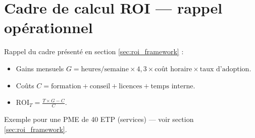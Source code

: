 \section{Cadre de calcul ROI — rappel opérationnel}
Rappel du cadre présenté en section \ref{sec:roi_framework} :
\begin{itemize}
    \item Gains mensuels $G = \text{heures/semaine} \times 4{,}3 \times \text{coût horaire} \times \text{taux d’adoption}$.
    \item Coûts $C = \text{formation} + \text{conseil} + \text{licences} + \text{temps interne}$.
    \item $\text{ROI}_T = \frac{T \times G - C}{C}$.
\end{itemize}
Exemple pour une PME de 40 ETP (services) — voir section \ref{sec:roi_framework}.
